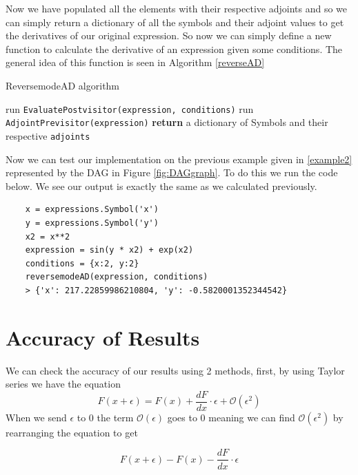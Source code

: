 \documentclass{article}
\begin{document}
Now we have populated all the elements with their respective adjoints and so we can simply return a dictionary of all the symbols and their adjoint values to get the derivatives of our original expression. So now we can simply define a new function to calculate the derivative of an expression given some conditions. The general idea of this function is seen in Algorithm \ref{reverseAD}

\begin{algorithm}[h]
\caption{ReversemodeAD algorithm}\label{reverseAD}
\begin{algorithmic}[1]
\State run \verb|EvaluatePostvisitor(expression, conditions)|
\State run \verb|AdjointPrevisitor(expression)|
\State \textbf{return} a dictionary of Symbols and their respective \verb|adjoints|
\EndProcedure
\end{algorithmic}
\end{algorithm}

Now we can test our implementation on the previous example given in \eqref{example2} represented by the DAG in Figure \ref{fig:DAGgraph}. To do this we run the code below. We see our output is exactly the same as we calculated previously.

\begin{verbatim}
    x = expressions.Symbol('x')
    y = expressions.Symbol('y')
    x2 = x**2
    expression = sin(y * x2) + exp(x2)
    conditions = {x:2, y:2}
    reversemodeAD(expression, conditions)
    > {'x': 217.22859986210804, 'y': -0.5820001352344542}
\end{verbatim}



\section{Accuracy of Results}

We can check the accuracy of our results using 2 methods, first, by using Taylor series we have the equation
\begin{equation}
    F(x + \epsilon) = F(x) + \frac{dF}{dx} \cdot \epsilon + \mathcal{O}(\epsilon ^ 2)
\end{equation}
When we send $\epsilon$ to 0 the term $\mathcal{O}(\epsilon)$ goes to 0 meaning we can find $\mathcal{O}(\epsilon^2)$ by rearranging the equation to get

\begin{equation}
    F(x + \epsilon) - F(x) - \frac{dF}{dx} \cdot \epsilon
\end{equation}
\end{document}
